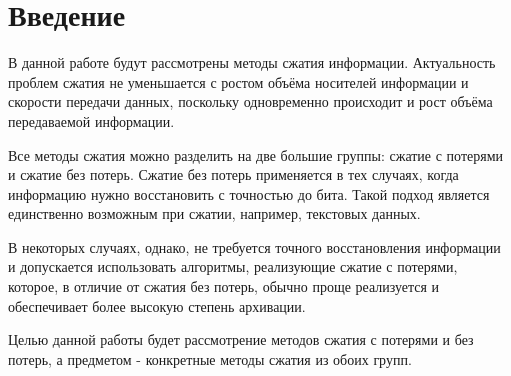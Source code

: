 \section*{Введение}%
%

В данной работе будут рассмотрены методы сжатия информации. Актуальность проблем сжатия не уменьшается с ростом объёма носителей информации и скорости передачи данных, поскольку одновременно происходит и рост объёма передаваемой информации. 

Все методы сжатия можно разделить на две большие группы: сжатие с потерями и сжатие без потерь. Сжатие без потерь применяется в тех случаях, когда информацию нужно восстановить с точностью до бита. Такой подход является единственно возможным при сжатии, например, текстовых данных. 

В некоторых случаях, однако, не требуется точного восстановления информации и допускается использовать алгоритмы, реализующие сжатие с потерями, которое, в отличие от сжатия без потерь, обычно проще реализуется и обеспечивает более высокую степень архивации. 

Целью данной работы будет рассмотрение методов сжатия с потерями и без потерь, а предметом - конкретные методы сжатия из обоих групп.
